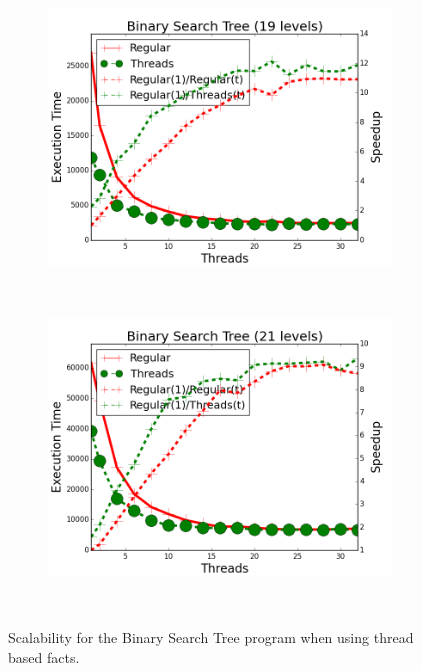 \begin{figure}[]
        \centering
        \begin{subfigure}[b]{\plotsize\textwidth}
           \includegraphics[width=\textwidth]{experiments/threads/cmp-key-value-19-ten.png}
           \label{fig:threads:key_value_19}
        \end{subfigure}
        ~
        \begin{subfigure}[b]{\plotsize\textwidth}
           \includegraphics[width=\textwidth]{experiments/threads/cmp-key-value-21-ten.png}
           \label{fig:threads:key_value_21}
        \end{subfigure} \\

        \caption{Scalability for the Binary Search Tree program when using
        thread based facts.}

        \label{fig:threads:results_key_value}
\end{figure}

\clearpage
